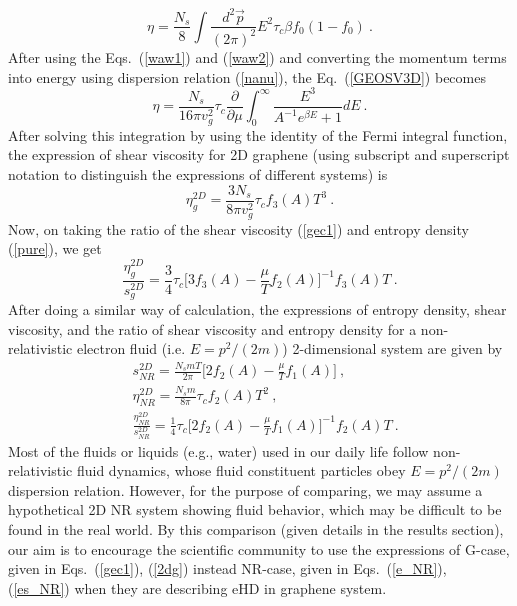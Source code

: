 \documentclass[amsmath,amssymb,aps,prb]{revtex4-2}
\begin{document}
%
    \begin{equation}
    \eta= \frac{N_s}{8} \int \frac{d^2 \vec{p}}{(2 \pi)^2} E^2 \tau_c \beta f_0(1-f_0)~.
    \label{GEOSV3D}
    \end{equation}
%
    After using the Eqs.~(\ref{waw1}) and (\ref{waw2}) and converting the momentum terms into energy using dispersion relation (\ref{nanu}), the Eq.~(\ref{GEOSV3D}) becomes
    \begin{equation}
    \eta = \frac{N_s }{16 \pi v_g^2} \tau_c \frac{\partial}{\partial \mu } \int_0^{\infty} \frac{E^3}{A^{-1} e^{\beta E} +1} dE~.
    \end{equation}
%
    After solving this integration by using the identity of the  Fermi integral function, the expression of shear viscosity for 2D graphene (using subscript and superscript notation to distinguish the expressions of different systems) is
    \begin{equation}
    \eta_g^{2D} = \frac{3 N_s }{8 \pi v_g^2}\tau_c f_3\left(A\right) T^3~.
    \label{gec1}
    \end{equation}
%
    Now, on taking the ratio of the shear viscosity (\ref{gec1}) and entropy density (\ref{pure}), we get 
    \begin{equation}
    \frac{\eta_{g}^{2D}}{ s_{g}^{2D}} = \frac{3 }{4}\tau_c \Bigg[3f_3\left(A\right) - \frac{\mu}{T} f_2\left(A\right) \Bigg]^{-1} f_3\left(A\right) T~.
    \label{2dg}
    \end{equation}
%
    After doing a similar way of calculation, the expressions of entropy density, shear viscosity, and the ratio of shear viscosity and entropy density for a non-relativistic electron fluid (i.e. $E=p^2/(2m)$) 2-dimensional system are given by
    \begin{align}
    & s_{NR}^{2D} = \frac{N_s m T}{2 \pi } \Bigg[2f_2\left(A\right) - \frac{\mu}{T} f_1\left(A\right) \Bigg]~,
    \label{pure1}\\
    & \eta_{NR}^{2D} = \frac{N_s m }{8 \pi}\tau_c f_2\left(A\right) T^2~,
    \label{e_NR}\\
    & \frac{\eta_{NR}^{2D}}{ s_{NR}^{2D}} = \frac{1}{4} \tau_c \Bigg[2f_2\left(A\right) - \frac{\mu}{T} f_1\left(A\right) \Bigg]^{-1} f_2\left(A\right) T~.
    \label{es_NR}
    \end{align}
    Most of the fluids or liquids (e.g., water) used in our daily life follow non-relativistic fluid dynamics, whose fluid constituent particles obey $E=p^2/(2m)$ dispersion relation. However, for the purpose of comparing, we may assume a hypothetical 2D NR system showing fluid behavior, which may be difficult to be found in the real world. By this comparison (given details in the results section), our aim is to encourage the scientific community to use the expressions of G-case, given in Eqs.~(\ref{gec1}), (\ref{2dg}) instead NR-case, given in Eqs.~(\ref{e_NR}), (\ref{es_NR}) when they are describing eHD in graphene system.
%
\end{document}
